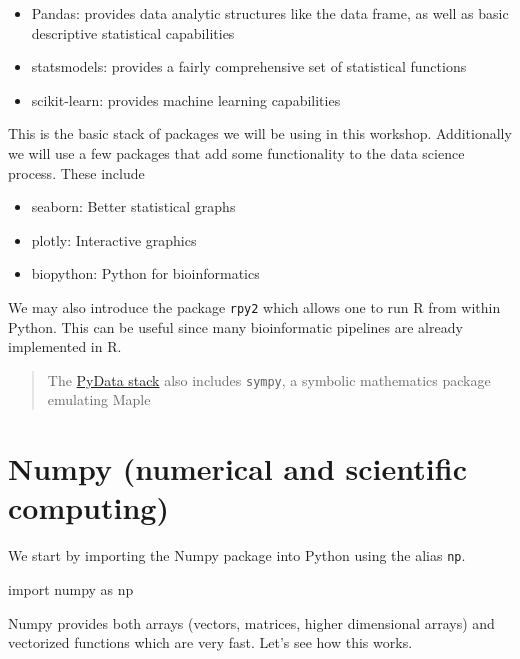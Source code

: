 \documentclass[
  letterpaper,
]{scrbook}
\newenvironment{Shaded}{\begin{snugshade}}{\end{snugshade}}
\newcommand{\ImportTok}[1]{#1}
\newcommand{\NormalTok}[1]{#1}
\providecommand{\tightlist}{%
  \setlength{\itemsep}{0pt}\setlength{\parskip}{0pt}}
\begin{document}
\begin{itemize}
\tightlist
\item
  Pandas: provides data analytic structures like the data frame, as well as basic descriptive statistical capabilities
\item
  statsmodels: provides a fairly comprehensive set of statistical functions
\item
  scikit-learn: provides machine learning capabilities
\end{itemize}

This is the basic stack of packages we will be using in this workshop. Additionally we will use a few packages that add some functionality to the data science process. These include

\begin{itemize}
\item
  seaborn: Better statistical graphs
\item
  plotly: Interactive graphics
\item
  biopython: Python for bioinformatics
\end{itemize}

We may also introduce the package \texttt{rpy2} which allows one to run R from within Python. This can be useful since many bioinformatic pipelines are already implemented in R.

\begin{quote}
The \href{https://scipy.org}{PyData stack} also includes \texttt{sympy}, a symbolic mathematics package emulating Maple
\end{quote}

\hypertarget{numpy-numerical-and-scientific-computing}{%
\section{Numpy (numerical and scientific computing)}\label{numpy-numerical-and-scientific-computing}}

We start by importing the Numpy package into Python using the alias \texttt{np}.

\begin{Shaded}
\begin{Highlighting}[]
\ImportTok{import}\NormalTok{ numpy }\ImportTok{as}\NormalTok{ np}
\end{Highlighting}
\end{Shaded}

Numpy provides both arrays (vectors, matrices, higher dimensional arrays) and vectorized functions which are very fast. Let's see how this works.
\end{document}
